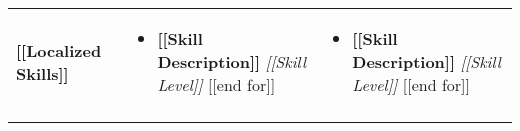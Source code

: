 \documentclass[11pt, a4paper]{article}
\begin{document}
\begin{tabularx}{\textwidth}{p{20mm} p{66mm} p{60mm}}
    \textbf{[[Localized Skills]]} &
    \vspace{-7mm}
    \begin{itemize}[leftmargin=*]
    [[for even Skill in Skills]]
        \item \textbf{[[Skill Description]]} \newline \small{\textit{[[Skill Level]]}}
    [[end for]]
    \end{itemize} &
    \vspace{-7mm}
    \begin{itemize}[leftmargin=*]
    [[for odd Skill in Skills]]
        \item \textbf{[[Skill Description]]} \newline \small{\textit{[[Skill Level]]}}
    [[end for]]
    \end{itemize} \\ &
\end{tabularx}
\end{document}
